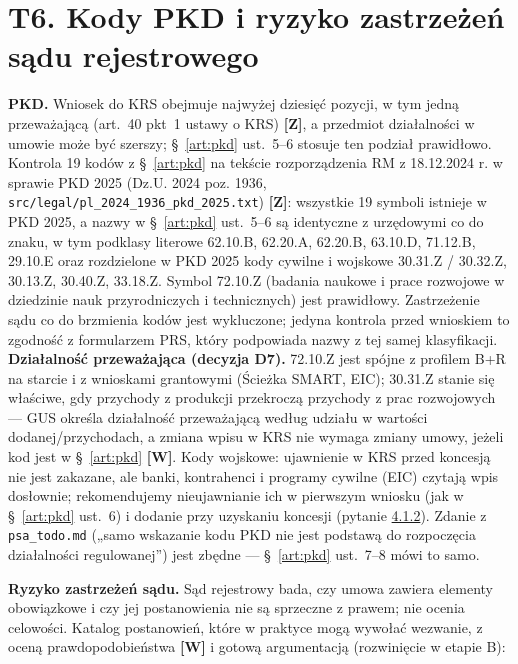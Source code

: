 \documentclass[12pt,a4paper]{report}
\newcommand{\Wiar}[1]{\textbf{[#1]}}
\begin{document}
\section*{T6. Kody PKD i ryzyko zastrzeżeń sądu rejestrowego}

\textbf{PKD.} Wniosek do KRS obejmuje najwyżej dziesięć pozycji, w tym jedną przeważającą (art.~40 pkt~1 ustawy o KRS) \Wiar{Z}, a przedmiot działalności w umowie może być szerszy; §~\ref{art:pkd} ust.~5--6 stosuje ten podział prawidłowo. Kontrola 19 kodów z §~\ref{art:pkd} na tekście rozporządzenia RM z 18.12.2024 r. w sprawie PKD 2025 (Dz.U. 2024 poz. 1936, \texttt{src/legal/pl\_2024\_1936\_pkd\_2025.txt}) \Wiar{Z}: wszystkie 19 symboli istnieje w PKD 2025, a nazwy w §~\ref{art:pkd} ust.~5--6 są identyczne z urzędowymi co do znaku, w tym podklasy literowe 62.10.B, 62.20.A, 62.20.B, 63.10.D, 71.12.B, 29.10.E oraz rozdzielone w PKD 2025 kody cywilne i wojskowe 30.31.Z / 30.32.Z, 30.13.Z, 30.40.Z, 33.18.Z. Symbol 72.10.Z (badania naukowe i prace rozwojowe w dziedzinie nauk przyrodniczych i technicznych) jest prawidłowy. Zastrzeżenie sądu co do brzmienia kodów jest wykluczone; jedyna kontrola przed wnioskiem to zgodność z formularzem PRS, który podpowiada nazwy z tej samej klasyfikacji.
\textbf{Działalność przeważająca (decyzja D7).} 72.10.Z jest spójne z profilem B+R na starcie i z wnioskami grantowymi (Ścieżka SMART, EIC); 30.31.Z stanie się właściwe, gdy przychody z produkcji przekroczą przychody z prac rozwojowych --- GUS określa działalność przeważającą według udziału w wartości dodanej/przychodach, a zmiana wpisu w KRS nie wymaga zmiany umowy, jeżeli kod jest w §~\ref{art:pkd} \Wiar{W}. Kody wojskowe: ujawnienie w KRS przed koncesją nie jest zakazane, ale banki, kontrahenci i programy cywilne (EIC) czytają wpis dosłownie; rekomendujemy nieujawnianie ich w pierwszym wniosku (jak w §~\ref{art:pkd} ust.~6) i dodanie przy uzyskaniu koncesji (pytanie \hyperref[memo:4.1.2]{4.1.2}). Zdanie z \texttt{psa\_todo.md} („samo wskazanie kodu PKD nie jest podstawą do rozpoczęcia działalności regulowanej”) jest zbędne --- §~\ref{art:pkd} ust.~7--8 mówi to samo.

\textbf{Ryzyko zastrzeżeń sądu.} Sąd rejestrowy bada, czy umowa zawiera elementy obowiązkowe i czy jej postanowienia nie są sprzeczne z prawem; nie ocenia celowości. Katalog postanowień, które w praktyce mogą wywołać wezwanie, z oceną prawdopodobieństwa \Wiar{W} i gotową argumentacją (rozwinięcie w etapie B):
\end{document}

